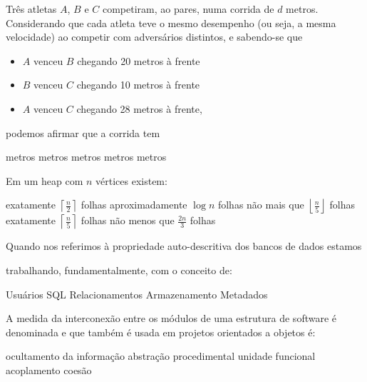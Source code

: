 \documentclass[12pt, addpoints]{exam}
\begin{document}
\begin{questions}
\question

Três atletas \( A \), \( B \) e \( C \) competiram, ao pares, numa corrida de \( d \) metros. Considerando que cada atleta teve o mesmo desempenho (ou seja, a mesma velocidade) ao competir com adversários distintos, e sabendo-se que



\begin{itemize}

    \item \( A \) venceu \( B \) chegando 20 metros à frente

    \item \( B \) venceu \( C \) chegando 10 metros à frente

    \item \( A \) venceu \( C \) chegando 28 metros à frente,

\end{itemize}



podemos afirmar que a corrida tem
\begin{choices}
 metros
 metros
 metros
 metros
 metros
\end{choices}

\question

Em um heap com \( n \) vértices existem:
\begin{choices}
\choice exatamente \( \left\lceil \frac{n}{2} \right\rceil \) folhas
\choice aproximadamente \( \log n \) folhas
\choice não mais que \( \left\lfloor \frac{n}{5} \right\rfloor \) folhas
\choice exatamente \( \left\lceil \frac{n}{5} \right\rceil \) folhas
\choice não menos que \( \frac{2n}{3} \) folhas
\end{choices}

\question

Quando nos referimos à propriedade auto-descritiva dos bancos de dados estamos

trabalhando, fundamentalmente, com o conceito de:
\begin{choices}
\choice Usuários
\choice SQL
\choice Relacionamentos
\choice Armazenamento
\choice Metadados
\end{choices}

\question

A medida da interconexão entre os módulos de uma estrutura de software é denominada e que também é usada em projetos orientados a objetos é: 
\begin{choices}
\choice ocultamento da informação
\choice abstração procedimental
\choice unidade funcional
\choice acoplamento
\choice coesão
\end{choices}


\end{questions}
\end{document}
